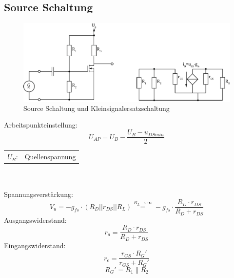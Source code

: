 



\subsection{Source Schaltung}
\begin{figure}[h!]
	\centering
	\includegraphics[width = \linewidth]{fet_source.pdf}
	\caption{Source Schaltung und Kleinsignalersatzschaltung}
	\label{fet:sourceschaltung}
\end{figure}
\noindent
Arbeitspunkteinstellung:
\[ U_{AP} = U_B - \frac{U_B - u_{DSmin}}{2} \]
\begin{tabular}{@{}ll}
  $U_B$:        & Quellenspannung
\end{tabular}
\\\\
Spannungsverstärkung:
\[ V_u = -g_{fs} \cdot (R_D || r_{DS} || R_L) \stackrel{R_L \to \infty}{=} 
-g_{fs} \cdot \frac{R_D \cdot r_{DS}}{R_D + r_{DS}} \]
Ausgangswiderstand:
\[ r_a = \frac{R_D \cdot r_{DS}}{R_D + r_{DS}} \]
Eingangswiderstand:
\[ r_e = \frac{r_{GS} \cdot R_G'}{r_{GS} + R_G'}\]
\[ R_G' = R_1 \parallel R_2 \]